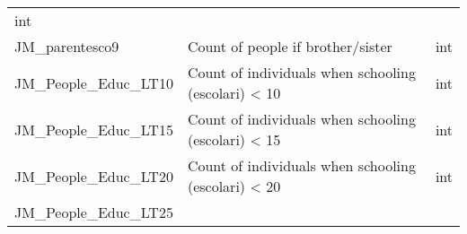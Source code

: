 \documentclass[11pt]{article}
\begin{document}
\begin{longtable}[]{@{}lll@{}}
\begin{minipage}[t]{0.16\columnwidth}
int\strut
\end{minipage}\tabularnewline
\begin{minipage}[t]{0.63\columnwidth}\raggedright\strut
JM\_parentesco9\strut
\end{minipage} & \begin{minipage}[t]{0.12\columnwidth}\raggedright\strut
Count of people if brother/sister\strut
\end{minipage} & \begin{minipage}[t]{0.16\columnwidth}\raggedright\strut
int\strut
\end{minipage}\tabularnewline
\begin{minipage}[t]{0.63\columnwidth}\raggedright\strut
JM\_People\_Educ\_LT10\strut
\end{minipage} & \begin{minipage}[t]{0.12\columnwidth}\raggedright\strut
Count of individuals when schooling (escolari) \textless{} 10\strut
\end{minipage} & \begin{minipage}[t]{0.16\columnwidth}\raggedright\strut
int\strut
\end{minipage}\tabularnewline
\begin{minipage}[t]{0.63\columnwidth}\raggedright\strut
JM\_People\_Educ\_LT15\strut
\end{minipage} & \begin{minipage}[t]{0.12\columnwidth}\raggedright\strut
Count of individuals when schooling (escolari) \textless{} 15\strut
\end{minipage} & \begin{minipage}[t]{0.16\columnwidth}\raggedright\strut
int\strut
\end{minipage}\tabularnewline
\begin{minipage}[t]{0.63\columnwidth}\raggedright\strut
JM\_People\_Educ\_LT20\strut
\end{minipage} & \begin{minipage}[t]{0.12\columnwidth}\raggedright\strut
Count of individuals when schooling (escolari) \textless{} 20\strut
\end{minipage} & \begin{minipage}[t]{0.16\columnwidth}\raggedright\strut
int\strut
\end{minipage}\tabularnewline
\begin{minipage}[t]{0.63\columnwidth}\raggedright\strut
JM\_People\_Educ\_LT25\strut
\end{minipage} & \begin{minipage}[t]{0.12\columnwidth}\raggedright\strut

\end{minipage}
\end{longtable}
\end{document}
